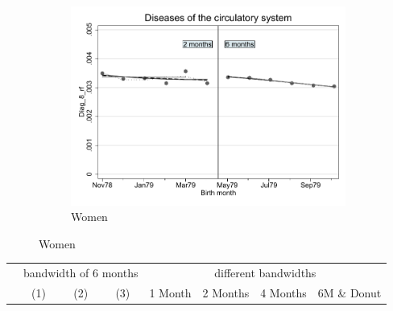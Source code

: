 \documentclass[a4paper ]{article}
\begin{document}
\begin{figure}[h]
\begin{subfigure}[t]{0.31\textwidth}
		\centering
		\includegraphics[width=0.99\textwidth]{R1_RD_Diag_8_rf_fits}
		\caption{Women}
	\end{subfigure}
\end{figure}


\begin{table}[h]\centering
\def\sym#1{\ifmmode^{#1}\else\(^{#1}\)\fi}
\begin{tabular}{l*{3}{c}|cccc}
\toprule
&\multicolumn{3}{c}{bandwidth of 6 months} & \multicolumn{4}{c}{different bandwidths} \\
 \cmidrule(lr{1em}){2-4} \cmidrule(lr{1em}){5-8}
 &\multicolumn{1}{c}{(1)}&\multicolumn{1}{c}{(2)}&\multicolumn{1}{c}{(3)}& 1 Month & 2 Months & 4 Months & 6M \& Donut \\
\midrule 

\bottomrule
\end{tabular}
\end{table}
\end{document}
